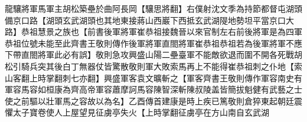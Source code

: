 龍驤將軍馬軍主胡松築壘於曲阿長岡【驤思將翻】右僕射沈文季為持節都督屯湖頭備京口路【湖頭玄武湖頭也其地東接蔣山西巖下西抵玄武湖隄地勢坦平當京口大路】恭祖慧景之族也【前書後軍將軍崔恭祖接魏晉以來官制左右前後將軍是為四軍恭祖位號未能至此齊書王敬則傳作後軍將軍直閤將軍崔恭祖恭祖若為後軍將軍不應下帶直閤將軍此必有誤】敬則急攻興盛山陽二壘臺軍不能敵欲退而圍不開各死戰胡松引騎兵突其後白丁無器仗皆驚散敬則軍大敗索馬再上不能得崔恭祖刺之仆地【索山客翻上時掌翻刺七亦翻】興盛軍客袁文曠斬之【軍客齊書王敬則傳作軍容南史有軍容馬容如桓康為齊高帝軍容蕭摩訶馬容陳智深斬陳叔陵盖皆簡拔魁健有武藝之士使之前驅以壯軍馬之容故以為名】乙酉傳首建康是時上疾已篤敬則倉猝東起朝廷震懼太子寶卷使人上屋望見征虜亭失火【上時掌翻征虜亭在方山南自玄武湖